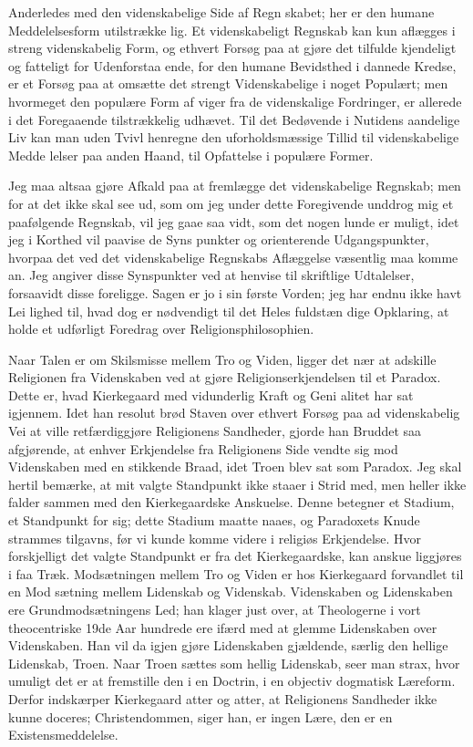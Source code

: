 \documentclass[12pt]{book}
\newcommand{\opage}[1]{\marginnote{\footnotesize\textit{[#1]}}}
\begin{document}
Anderledes med den videnskabelige Side af Regn\-%
skabet; her er den humane Meddelelsesform utilstrække\-%
lig. Et videnskabeligt Regnskab kan kun aflægges i
streng videnskabelig Form, og ethvert Forsøg paa at
gjøre det tilfulde kjendeligt og fatteligt for Udenforstaa\-%
ende, for den humane Bevidsthed i dannede Kredse, er
et Forsøg paa at omsætte det strengt Videnskabelige i
noget Populært; men hvormeget den populære Form af\-%
viger fra de videnskalige Fordringer, er allerede i det
Foregaaende tilstrækkelig udhævet. Til det Bedøvende
i Nutidens aandelige Liv kan man uden Tvivl henregne
den uforholdsmæssige Tillid til videnskabelige Medde\-%
lelser paa anden Haand, til Opfattelse i populære Former.

Jeg maa altsaa gjøre Afkald paa at fremlægge det
\opage{229}\setcounter{footnote}{0}%
videnskabelige Regnskab; men for at det ikke skal see
ud, som om jeg under dette Foregivende unddrog mig et
paafølgende Regnskab, vil jeg gaae saa vidt, som det nogen\-%
lunde er muligt, idet jeg i Korthed vil paavise de Syns\-%
punkter og orienterende Udgangspunkter, hvorpaa det ved
det videnskabelige Regnskabs Aflæggelse væsentlig maa
komme an. Jeg angiver disse Synspunkter ved at henvise til
skriftlige Udtalelser, forsaavidt disse foreligge. Sagen
er jo i sin første Vorden; jeg har endnu ikke havt Lei\-%
lighed til, hvad dog er nødvendigt til det Heles fuldstæn\-%
dige Opklaring, at holde et udførligt Foredrag over
Religionsphilosophien.

Naar Talen er om Skilsmisse mellem Tro og Viden,
ligger det nær at adskille Religionen fra Videnskaben
ved at gjøre Religionserkjendelsen til et Paradox. Dette
er, hvad Kierkegaard med vidunderlig Kraft og Geni\-%
alitet har sat igjennem. Idet han resolut brød Staven
over ethvert Forsøg paa ad videnskabelig Vei at ville
retfærdiggjøre Religionens Sandheder, gjorde han Bruddet
saa afgjørende, at enhver Erkjendelse fra Religionens Side
vendte sig mod Videnskaben med en stikkende Braad, idet
Troen blev sat som Paradox. Jeg skal hertil bemærke, at
mit valgte Standpunkt ikke staaer i Strid med, men
heller ikke falder sammen med den Kierkegaardske
Anskuelse. Denne betegner et Stadium, et Standpunkt
for sig; dette Stadium maatte naaes, og Paradoxets
Knude strammes tilgavns, før vi kunde komme videre
i religiøs Erkjendelse. Hvor forskjelligt det valgte
Standpunkt er fra det Kierkegaardske, kan anskue\-%
liggjøres i faa Træk. Modsætningen mellem Tro
og Viden er hos Kierkegaard forvandlet til en Mod\-%
sætning mellem Lidenskab og Videnskab. Videnskaben
og Lidenskaben ere Grundmodsætningens Led; han klager
just over, at Theologerne i vort theocentriske 19de Aar\-%
\opage{230}\setcounter{footnote}{0}%
hundrede ere ifærd med at glemme Lidenskaben over
Videnskaben. Han vil da igjen gjøre Lidenskaben
gjældende, særlig den hellige Lidenskab, Troen. Naar
Troen sættes som hellig Lidenskab, seer man strax,
hvor umuligt det er at fremstille den i en Doctrin,
i en objectiv dogmatisk Læreform. Derfor indskærper
Kierkegaard atter og atter, at Religionens Sandheder ikke
kunne doceres; Christendommen, siger han, er ingen
Lære, den er en Existensmeddelelse.
\end{document}
